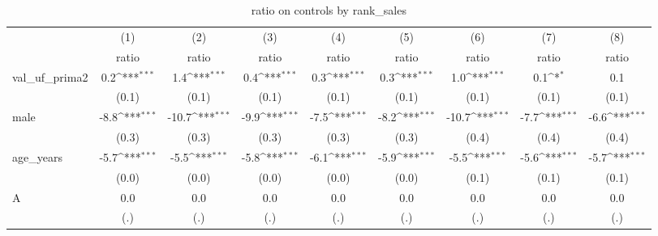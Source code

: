 \begin{table}[htbp]\centering
\def\sym#1{\ifmmode^{#1}\else\(^{#1}\)\fi}
\caption{ratio on controls by rank\_sales}
\begin{tabular}{l*{8}{c}}
\hline\hline
                    &\multicolumn{1}{c}{(1)}&\multicolumn{1}{c}{(2)}&\multicolumn{1}{c}{(3)}&\multicolumn{1}{c}{(4)}&\multicolumn{1}{c}{(5)}&\multicolumn{1}{c}{(6)}&\multicolumn{1}{c}{(7)}&\multicolumn{1}{c}{(8)}\\
                    &\multicolumn{1}{c}{ratio}&\multicolumn{1}{c}{ratio}&\multicolumn{1}{c}{ratio}&\multicolumn{1}{c}{ratio}&\multicolumn{1}{c}{ratio}&\multicolumn{1}{c}{ratio}&\multicolumn{1}{c}{ratio}&\multicolumn{1}{c}{ratio}\\
\hline
val\_uf\_prima2       &         0.2\sym{***}&         1.4\sym{***}&         0.4\sym{***}&         0.3\sym{***}&         0.3\sym{***}&         1.0\sym{***}&         0.1\sym{*}  &         0.1         \\
                    &       (0.1)         &       (0.1)         &       (0.1)         &       (0.1)         &       (0.1)         &       (0.1)         &       (0.1)         &       (0.1)         \\
[1em]
male                &        -8.8\sym{***}&       -10.7\sym{***}&        -9.9\sym{***}&        -7.5\sym{***}&        -8.2\sym{***}&       -10.7\sym{***}&        -7.7\sym{***}&        -6.6\sym{***}\\
                    &       (0.3)         &       (0.3)         &       (0.3)         &       (0.3)         &       (0.3)         &       (0.4)         &       (0.4)         &       (0.4)         \\
[1em]
age\_years           &        -5.7\sym{***}&        -5.5\sym{***}&        -5.8\sym{***}&        -6.1\sym{***}&        -5.9\sym{***}&        -5.5\sym{***}&        -5.6\sym{***}&        -5.7\sym{***}\\
                    &       (0.0)         &       (0.0)         &       (0.0)         &       (0.0)         &       (0.0)         &       (0.1)         &       (0.1)         &       (0.1)         \\
[1em]
A                   &         0.0         &         0.0         &         0.0         &         0.0         &         0.0         &         0.0         &         0.0         &         0.0         \\
                    &         (.)         &         (.)         &         (.)         &         (.)         &         (.)         &         (.)         &         (.)         &         (.)         \\

\end{tabular}
\end{table}
